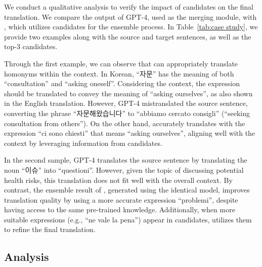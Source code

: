 We conduct a qualitative analysis to verify the impact of candidates on the final translation. 
We compare the output of GPT-4, used as the merging module, with \ours, which utilizes candidates for the ensemble process.
In Table~\ref{tab:case study}, we provide two examples along with the source and target sentences, as well as the top-3 candidates.


Through the first example, we can observe that \ours can appropriately translate homonyms within the context.
In Korean, ``자문'' has the meaning of both ``consultation'' and ``asking oneself''.
Considering the context, the expression should be translated to convey the meaning of ``asking ourselves'', as also shown in the English translation.
However, GPT-4 mistranslated the source sentence, converting the phrase ``자문해왔습니다'' to ``abbiamo cercato consigli'' (``seeking consultation from others'').
On the other hand, \ours accurately translates with the expression ``ci sono chiesti'' that means ``asking ourselves'', aligning well with the context by leveraging information from candidates.


In the second sample, GPT-4 translates the source sentence by translating the noun ``이슈'' into ``questioni''.
However, given the topic of discussing potential health risks, this translation does not fit well with the overall context.
By contrast, the ensemble result of \ours, generated using the identical model, improves translation quality by using a more accurate expression ``problemi'', despite having access to the same pre-trained knowledge.
Additionally, when more suitable expressions (e.g., ``ne vale la pena'') appear in candidates, \ours utilizes them to refine the final translation.


\subsection{Analysis}



